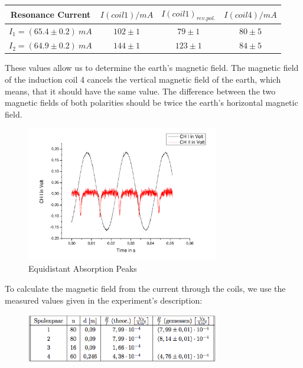 \begin{center}
\begin{tabular}[H]{c | c c c}
Resonance Current & $I(coil1)/mA$ & $I(coil1)_{rev.pol.}$ & $I(coil4)/mA$ \\ \hline
$I_1 = (65.4 \pm 0.2)\ mA$ & $102 \pm 1$ & $79 \pm 1$ & $80 \pm 5$ \\
$I_2 = (64.9 \pm 0.2 )\ mA$ & $144 \pm 1$ & $123\pm1$ & $84\pm5$ \\
\end{tabular}
\end{center}

These values allow us to determine the earth's magnetic field. The magnetic field of the induction coil 4 cancels the vertical magnetic field of the earth, which means, that it should have the same value. The difference between the two magnetic fields of both polarities should be twice the earth's horizontal magnetic field.\\

\begin{figure}[H]
\centering \includegraphics[width=0.75\textwidth]{BilderAusw/DRequi.pdf}
\caption{Equidistant Absorption Peaks}
\end{figure}


To calculate the magnetic field from the current through the coils, we use the measured values given in the experiment's description:

\begin{figure}[H]
\centering \includegraphics[width=0.75\textwidth]{BilderAusw/Spulenumr.png}
\end{figure}

